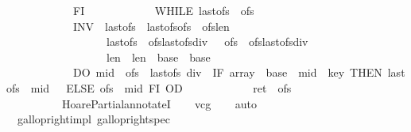\begin{isabellebody}
\ \ \ \ \ \ \ \ \ \ \ \ FI{\isacharsemicolon}{\isacharsemicolon}\isanewline
\ \ \ \ \ \ \ \ \ \ \ \ WHILE\ {\isasymacute}last{\isacharunderscore}ofs\ {\isacharless}\ {\isasymacute}ofs\ \isanewline
\ \ \ \ \ \ \ \ \ \ \ \ INV\ {\isasymlbrace}\ {\isasymacute}last{\isacharunderscore}ofs{\isasymge}{}\ {\isasymand}\ {\isasymacute}last{\isacharunderscore}ofs{\isasymle}{\isasymacute}ofs\ {\isasymand}\ {\isasymacute}ofs{\isasymle}{\isasymacute}len\ {\isasymand}\isanewline
\ \ \ \ \ \ \ \ \ \ \ \ \ \ \ \ \ \ {\isasymacute}last{\isacharunderscore}ofs\ {\isasymle}\ {\isacharparenleft}{\isasymacute}ofs{\isacharplus}{\isasymacute}last{\isacharunderscore}ofs{\isacharparenright}div\ {}\ {\isasymand}\ {\isasymacute}ofs\ {\isasymge}\ {\isacharparenleft}{\isasymacute}ofs{\isacharplus}{\isasymacute}last{\isacharunderscore}ofs{\isacharparenright}div\ {}\ {\isasymand}\isanewline
\ \ \ \ \ \ \ \ \ \ \ \ \ \ \ \ \ \ {\isasymacute}len\ {\isacharequal}\ \isactrlbsup {\isasymsigma}\isactrlesup len\ {\isasymand}\ {\isasymacute}base\ {\isacharequal}\ \isactrlbsup {\isasymsigma}\isactrlesup base\ {\isasymrbrace}\isanewline
\ \ \ \ \ \ \ \ \ \ \ \ DO\ {\isasymacute}mid\ {\isacharcolon}{\isacharequal}{\isacharequal}\ {\isacharparenleft}{\isasymacute}ofs\ {\isacharplus}\ {\isasymacute}last{\isacharunderscore}ofs{\isacharparenright}\ div\ {}{\isacharsemicolon}{\isacharsemicolon}\ IF\ {\isasymacute}array\ {\isacharbang}\ {\isacharparenleft}{\isasymacute}base\ {\isacharplus}\ {\isasymacute}mid{\isacharparenright}\ {\isacharless}\ {\isasymacute}key\ THEN\ {\isasymacute}last{\isacharunderscore}ofs\ {\isacharcolon}{\isacharequal}{\isacharequal}\ {\isasymacute}mid\ {\isacharplus}\ {}\ ELSE\ {\isasymacute}ofs\ {\isacharcolon}{\isacharequal}{\isacharequal}\ {\isasymacute}mid\ FI\ OD{\isacharsemicolon}{\isacharsemicolon}\isanewline
\ \ \ \ \ \ \ \ \ \ \ \ {\isasymacute}ret\ {\isacharcolon}{\isacharequal}{\isacharequal}\ {\isasymacute}ofs\isanewline
\ \ \ \ \ \ \ \ {\isachardoublequoteclose}\ \ HoarePartial{\isachardot}annotateI{\isacharparenright}\isanewline
\ \ \isamarkupfalse%
\ vcg\isanewline
\ \ \isamarkupfalse%
\ auto%
\endisatagproof
{\isafoldproof}%
%
\isadelimproof
\ \isanewline
%
\endisadelimproof
\ \ \isanewline
\isanewline
{}\isamarkupfalse%
\ {\isacharparenleft}\ gallop{\isacharunderscore}right{\isacharunderscore}impl{\isacharparenright}\ gallop{\isacharunderscore}right{\isacharunderscore}spec{\isacharcolon}\isanewline
\ \ \isanewline

\end{isabellebody}
